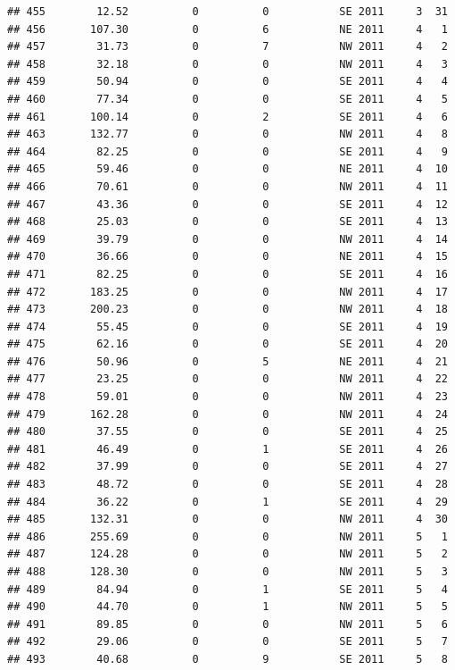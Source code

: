 \documentclass[
]{article}
\begin{document}
\begin{verbatim}
## 455        12.52          0          0           SE 2011     3  31
## 456       107.30          0          6           NE 2011     4   1
## 457        31.73          0          7           NW 2011     4   2
## 458        32.18          0          0           NW 2011     4   3
## 459        50.94          0          0           SE 2011     4   4
## 460        77.34          0          0           SE 2011     4   5
## 461       100.14          0          2           SE 2011     4   6
## 463       132.77          0          0           NW 2011     4   8
## 464        82.25          0          0           SE 2011     4   9
## 465        59.46          0          0           NE 2011     4  10
## 466        70.61          0          0           NW 2011     4  11
## 467        43.36          0          0           SE 2011     4  12
## 468        25.03          0          0           SE 2011     4  13
## 469        39.79          0          0           NW 2011     4  14
## 470        36.66          0          0           NE 2011     4  15
## 471        82.25          0          0           SE 2011     4  16
## 472       183.25          0          0           NW 2011     4  17
## 473       200.23          0          0           NW 2011     4  18
## 474        55.45          0          0           SE 2011     4  19
## 475        62.16          0          0           SE 2011     4  20
## 476        50.96          0          5           NE 2011     4  21
## 477        23.25          0          0           NW 2011     4  22
## 478        59.01          0          0           NW 2011     4  23
## 479       162.28          0          0           NW 2011     4  24
## 480        37.55          0          0           SE 2011     4  25
## 481        46.49          0          1           SE 2011     4  26
## 482        37.99          0          0           SE 2011     4  27
## 483        48.72          0          0           SE 2011     4  28
## 484        36.22          0          1           SE 2011     4  29
## 485       132.31          0          0           NW 2011     4  30
## 486       255.69          0          0           NW 2011     5   1
## 487       124.28          0          0           NW 2011     5   2
## 488       128.30          0          0           NW 2011     5   3
## 489        84.94          0          1           SE 2011     5   4
## 490        44.70          0          1           NW 2011     5   5
## 491        89.85          0          0           NW 2011     5   6
## 492        29.06          0          0           SE 2011     5   7
## 493        40.68          0          9           SE 2011     5   8

\end{verbatim}
\end{document}
